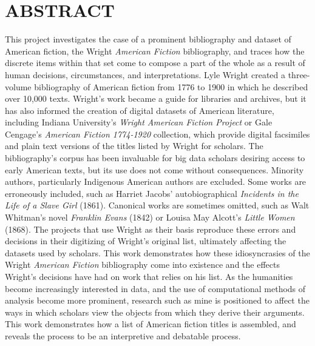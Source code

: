 %
%
%
%

\chapter*{ABSTRACT}

\pagestyle{plain} %
\setcounter{page}{2}

\indent This project investigates the case of a prominent bibliography and dataset of American fiction, the Wright \textit{American Fiction} bibliography, and traces how the discrete items within that set come to compose a part of the whole as a result of human decisions, circumstances, and interpretations. Lyle Wright created a three-volume bibliography of American fiction from 1776 to 1900  in which he described over 10,000 texts. Wright’s work became a guide for libraries and archives, but it has also informed the creation of digital datasets of American literature, including Indiana University’s \textit{Wright American Fiction Project} or Gale Cengage’s \textit{American Fiction 1774-1920} collection, which provide digital facsimiles and plain text versions of the titles listed by Wright for scholars. The bibliography’s corpus has been invaluable for big data scholars desiring access to early American texts, but its use does not come without consequences. Minority authors, particularly Indigenous American authors are excluded. Some works are erroneously included, such as Harriet Jacobs’ autobiographical \textit{Incidents in the Life of a Slave Girl} (1861). Canonical works are sometimes omitted, such as Walt Whitman’s novel \textit{Franklin Evans} (1842) or Louisa May Alcott’s \textit{Little Women} (1868). The projects that use Wright as their basis reproduce these errors and decisions in their digitizing of Wright’s original list, ultimately affecting the datasets used by scholars. This work demonstrates how these idiosyncrasies of the Wright \textit{American Fiction} bibliography come into existence and the effects Wright’s decisions have had on work that relies on his list. As the humanities become increasingly interested in data, and the use of computational methods of analysis become more prominent, research such as mine is positioned to affect the ways in which scholars view the objects from which they derive their arguments. This work demonstrates how a list of American fiction titles is assembled, and reveals the process to be an interpretive and debatable process. 


\pagebreak{}
